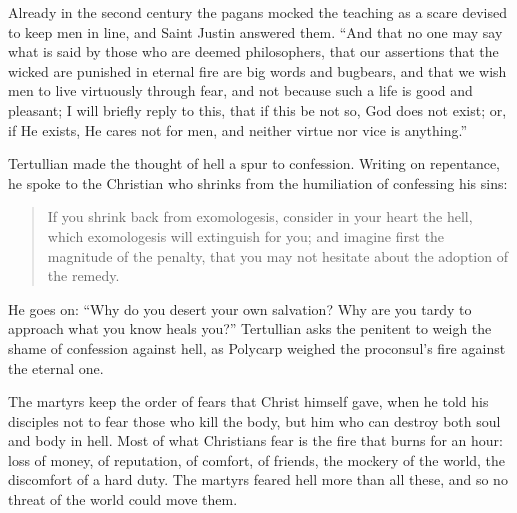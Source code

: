 Already in the second century the pagans mocked the teaching as a scare devised to keep men in line, and Saint Justin answered them. ``And that no one may say what is said by those who are deemed philosophers, that our assertions that the wicked are punished in eternal fire are big words and bugbears, and that we wish men to live virtuously through fear, and not because such a life is good and pleasant; I will briefly reply to this, that if this be not so, God does not exist; or, if He exists, He cares not for men, and neither virtue nor vice is anything.''

Tertullian made the thought of hell a spur to confession. Writing on repentance, he spoke to the Christian who shrinks from the humiliation of confessing his sins:

\begin{quote}
If you shrink back from exomologesis, consider in your heart the hell, which exomologesis will extinguish for you; and imagine first the magnitude of the penalty, that you may not hesitate about the adoption of the remedy.
\end{quote}

\noindent He goes on: ``Why do you desert your own salvation? Why are you tardy to approach what you know heals you?'' Tertullian asks the penitent to weigh the shame of confession against hell, as Polycarp weighed the proconsul's fire against the eternal one.

The martyrs keep the order of fears that Christ himself gave, when he told his disciples not to fear those who kill the body, but him who can destroy both soul and body in hell. Most of what Christians fear is the fire that burns for an hour: loss of money, of reputation, of comfort, of friends, the mockery of the world, the discomfort of a hard duty. The martyrs feared hell more than all these, and so no threat of the world could move them.
